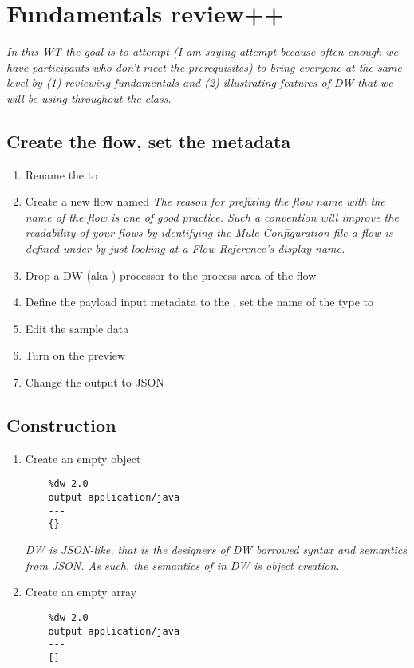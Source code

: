 \section{Fundamentals review++}
\emph{
  In this WT the goal is to attempt (I am saying attempt because often enough we have participants who don’t meet the prerequisites) to bring everyone at the same level by (1) reviewing fundamentals and (2) illustrating features of DW that we will be using throughout the class.
}

\subsection{Create the flow, set the metadata}
\begin{enumerate}
\item Rename the  to 
\item Create a new flow named 
  \newline
  \emph{
    The reason for prefixing the flow name with the name of the flow is one of good practice.
    Such a convention will improve the readability of your flows by identifying the
    Mule Configuration file a flow is defined under by just looking at a Flow Reference's
    display name.
  }
\item Drop a DW (aka ) processor to the process area of the flow
\item Define the payload input metadata to the ,
  set the name of the type to 
\item Edit the sample data
\item Turn on the preview
\item Change the output to JSON
\end{enumerate}

\subsection{Construction}
\begin{enumerate}[resume*]
\item Create an empty object
  \begin{verbatim}
    %dw 2.0
    output application/java
    ---
    {}
  \end{verbatim}
  \emph{
    DW is JSON-like, that is the designers of DW borrowed syntax and semantics from JSON.  As such, the semantics of \ttt{{}} in DW is object creation.   
  }
\item Create an empty array
  \begin{verbatim}
    %dw 2.0
    output application/java
    ---
    []
  \end{verbatim}
\end{enumerate}


